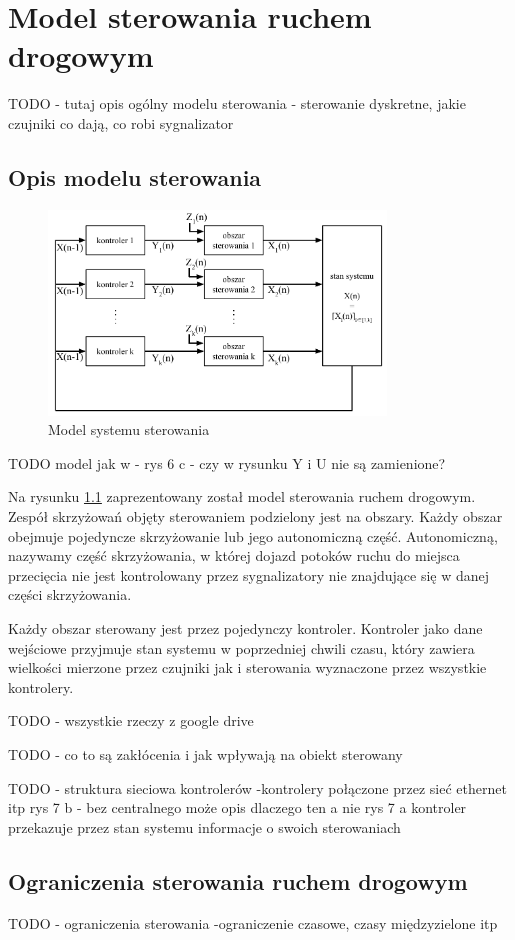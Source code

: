 \chapter{Model sterowania ruchem drogowym}
\label{chap:model}
TODO - tutaj opis ogólny modelu sterowania - sterowanie dyskretne, jakie czujniki co dają, co robi sygnalizator

\section{Opis modelu sterowania}
\label{sec:model_opis}

\begin{figure}[h]
    \centering
    \includegraphics[width=0.8\textwidth]{images/model.pdf}
    \caption{Model systemu sterowania}
    \label{fig:model}
\end{figure}

TODO model jak w \cite{kawalec+sobieszuk-durka} - rys 6 c - czy w rysunku Y i U nie są zamienione?

Na rysunku \ref{fig:model} zaprezentowany został model sterowania ruchem drogowym.
Zespół skrzyżowań objęty sterowaniem podzielony jest na obszary.
Każdy obszar obejmuje pojedyncze skrzyżowanie lub jego autonomiczną część.
Autonomiczną, nazywamy część skrzyżowania, w której dojazd potoków ruchu do miejsca przecięcia nie jest kontrolowany
przez sygnalizatory nie znajdujące się w danej części skrzyżowania.

Każdy obszar sterowany jest przez pojedynczy kontroler.
Kontroler jako dane wejściowe przyjmuje stan systemu w poprzedniej chwili czasu,
który zawiera wielkości mierzone przez czujniki jak i sterowania wyznaczone przez wszystkie kontrolery.

TODO - wszystkie rzeczy z google drive

TODO - co to są zakłócenia i jak wpływają na obiekt sterowany

TODO - struktura sieciowa kontrolerów -kontrolery połączone przez sieć ethernet itp
\cite{kawalec+sobieszuk-durka} rys 7 b - bez centralnego
może opis dlaczego ten a nie rys 7 a
kontroler przekazuje przez stan systemu informacje o swoich sterowaniach

\section{Ograniczenia sterowania ruchem drogowym}
\label{sec:model_ograniczenia}
TODO - ograniczenia sterowania -ograniczenie czasowe, czasy międzyzielone itp